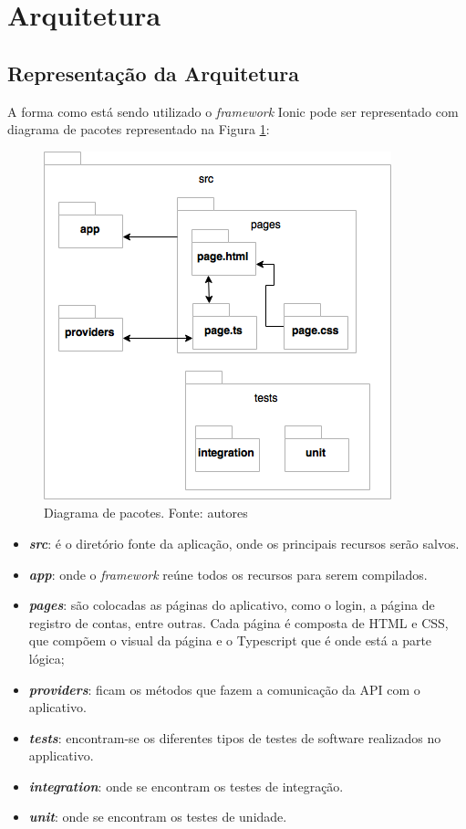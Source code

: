 \section{Arquitetura}

\subsection{Representação da Arquitetura}

A forma como está sendo utilizado o \textit{framework} Ionic pode ser representado com diagrama de pacotes representado na Figura \ref{img:pacotes}:

\begin{figure}[H]
    \centering
    \includegraphics[scale=0.5]{figuras/ionic_arch.png}
    \caption[Diagrama de pacotes do aplicativo]{Diagrama de pacotes. Fonte: autores}
    \label{img:pacotes}
\end{figure}
\pagebreak

\begin{itemize}
\item\textbf{\textit{src}}: é o diretório fonte da aplicação, onde os principais recursos serão salvos.
\item\textbf{\textit{app}}: onde o \textit{framework} reúne todos os recursos para serem compilados.
\item\textbf{\textit{pages}}: são colocadas as páginas do aplicativo, como o login, a página de registro de contas, entre outras. Cada página é composta de HTML e CSS, que compõem o visual da página e o Typescript que é onde está a parte lógica;
\item\textbf{\textit{providers}}: ficam os métodos que fazem a comunicação da API com o aplicativo.
\item\textbf{\textit{tests}}: encontram-se os diferentes tipos de testes de software realizados no applicativo.
\item\textbf{\textit{integration}}: onde se encontram os testes de integração.
\item\textbf{\textit{unit}}: onde se encontram os testes de unidade.
\end{itemize}

